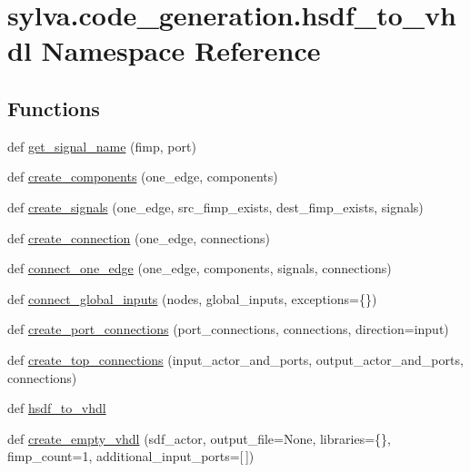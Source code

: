 \hypertarget{namespacesylva_1_1code__generation_1_1hsdf__to__vhdl}{}\section{sylva.\+code\+\_\+generation.\+hsdf\+\_\+to\+\_\+vhdl Namespace Reference}
\label{namespacesylva_1_1code__generation_1_1hsdf__to__vhdl}
\subsection*{Functions}
\begin{DoxyCompactItemize}
\item 
def \hyperlink{namespacesylva_1_1code__generation_1_1hsdf__to__vhdl_adfe6fda6b02f34c7fd4f2775ced8228f}{get\+\_\+signal\+\_\+name} (fimp, port)
\item 
def \hyperlink{namespacesylva_1_1code__generation_1_1hsdf__to__vhdl_a3672bd3c4fb6d5c86df2d4cd1f64e875}{create\+\_\+components} (one\+\_\+edge, components)
\item 
def \hyperlink{namespacesylva_1_1code__generation_1_1hsdf__to__vhdl_a7b3765f9d22f02a29cb6ecfb267ae7f0}{create\+\_\+signals} (one\+\_\+edge, src\+\_\+fimp\+\_\+exists, dest\+\_\+fimp\+\_\+exists, signals)
\item 
def \hyperlink{namespacesylva_1_1code__generation_1_1hsdf__to__vhdl_a5381a4c2d460f5f0490d0361e37917e9}{create\+\_\+connection} (one\+\_\+edge, connections)
\item 
def \hyperlink{namespacesylva_1_1code__generation_1_1hsdf__to__vhdl_a5976ee6a55f22e1fc1e9fc87bac3ea62}{connect\+\_\+one\+\_\+edge} (one\+\_\+edge, components, signals, connections)
\item 
def \hyperlink{namespacesylva_1_1code__generation_1_1hsdf__to__vhdl_a4a40923ef153cf1f1a9da0c742b2e542}{connect\+\_\+global\+\_\+inputs} (nodes, global\+\_\+inputs, exceptions=\{\})
\item 
def \hyperlink{namespacesylva_1_1code__generation_1_1hsdf__to__vhdl_a32b4f40eadeb985a68674b401be7a1dc}{create\+\_\+port\+\_\+connections} (port\+\_\+connections, connections, direction=\textquotesingle{}input\textquotesingle{})
\item 
def \hyperlink{namespacesylva_1_1code__generation_1_1hsdf__to__vhdl_a09020e1a1ea5a2d3e4b8cdd35f51a185}{create\+\_\+top\+\_\+connections} (input\+\_\+actor\+\_\+and\+\_\+ports, output\+\_\+actor\+\_\+and\+\_\+ports, connections)
\item 
def \hyperlink{namespacesylva_1_1code__generation_1_1hsdf__to__vhdl_a0725288caa57a5c518a1b9c2683291fa}{hsdf\+\_\+to\+\_\+vhdl}
\item 
def \hyperlink{namespacesylva_1_1code__generation_1_1hsdf__to__vhdl_a34788575516a0c7731b0e5abd4d42231}{create\+\_\+empty\+\_\+vhdl} (sdf\+\_\+actor, output\+\_\+file=None, libraries=\{\}, fimp\+\_\+count=1, additional\+\_\+input\+\_\+ports=\mbox{[}$\,$\mbox{]})
\end{DoxyCompactItemize}
